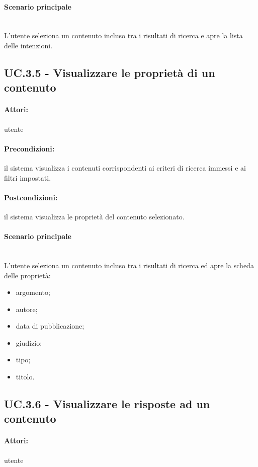 \documentclass[10pt,a4paper,headinclude,footinclude,hidelinks]{scrreprt} %
\begin{document}
	\paragraph{Scenario principale} \hfill \\
	L'utente seleziona un contenuto incluso tra i risultati di ricerca e apre la lista delle intenzioni.

	\subsection[UC.3.5]{UC.3.5 - Visualizzare le proprietà di un contenuto}
	\label{sec:stage:ar:uc:3_5}
	\paragraph{Attori:} utente
	\paragraph{Precondizioni:} il sistema visualizza i contenuti corrispondenti ai criteri di ricerca immessi e ai filtri impostati.
	\paragraph{Postcondizioni:} il sistema visualizza le proprietà del contenuto selezionato. 
	\paragraph{Scenario principale} \hfill \\
	L'utente seleziona un contenuto incluso tra i risultati di ricerca ed apre la scheda delle proprietà:
	\begin{itemize}
	\item argomento;
	\item autore;
	\item data di pubblicazione;
	\item giudizio;
	\item tipo;
	\item titolo.
	\end{itemize}

	\subsection[UC.3.6]{UC.3.6 - Visualizzare le risposte ad un contenuto}
	\label{sec:stage:ar:uc:3_6}
	\paragraph{Attori:} utente
\end{document}
